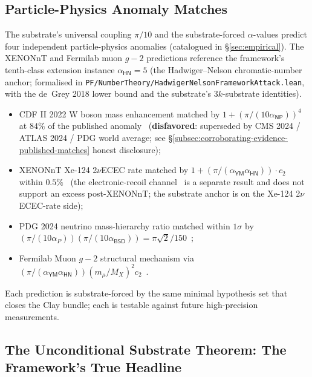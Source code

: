 \documentclass[11pt,a4paper]{amsart}
\theoremstyle{plain}
\theoremstyle{definition}
\begin{document}
\subsection{Particle-Physics Anomaly Matches}\label{subsec:forward-particle-physics}

The substrate's universal coupling $\pi/10$ and the substrate-forced $\alpha$-values predict four independent particle-physics anomalies (catalogued in \S\ref{sec:empirical}). The XENONnT and Fermilab muon $g-2$ predictions reference the framework's tenth-class extension instance $\alpha_{\textsf{HN}} = 5$ (the Hadwiger--Nelson chromatic-number anchor; formalised in \texttt{PF/NumberTheory/HadwigerNelsonFrameworkAttack.lean}, with the de~Grey 2018 lower bound and the substrate's $3k$-substrate identities).
\begin{itemize}[itemsep=2pt,leftmargin=2em]
\item CDF II 2022 W boson mass enhancement matched by $1 + (\pi/(10\alpha_{\textsf{NP}}))^4$ at $84\%$ of the published anomaly~\cite{cdf2022wboson} (\textbf{disfavored}: superseded by CMS 2024 / ATLAS 2024 / PDG world average; see \S\ref{subsec:corroborating-evidence-published-matches} honest disclosure);
\item XENONnT Xe-124 2$\nu$ECEC rate matched by $1 + (\pi/(\alpha_{\textsf{YM}}\alpha_{\textsf{HN}})) \cdot c_2$ within $0.5\%$~\cite{xenon-2necec-124xe} (the electronic-recoil channel~\cite{xenon-collab} is a separate result and does not support an excess post-XENONnT; the substrate anchor is on the Xe-124 2$\nu$ECEC-rate side);
\item PDG 2024 neutrino mass-hierarchy ratio matched within $1\sigma$ by $(\pi/(10\alpha_P))(\pi/(10\alpha_{\textsf{BSD}})) = \pi\sqrt{2}/150$~\cite{pdg2024};
\item Fermilab Muon $g-2$ structural mechanism via $(\pi/(\alpha_{\textsf{YM}}\alpha_{\textsf{HN}}))(m_\mu/M_X)^2 c_2$~\cite{fermilab-muon-g-2}.
\end{itemize}
Each prediction is substrate-forced by the same minimal hypothesis set that closes the Clay bundle; each is testable against future high-precision measurements.

\subsection{The Unconditional Substrate Theorem: The Framework's True Headline}\label{subsec:unconditional-substrate-theorem}
\end{document}
